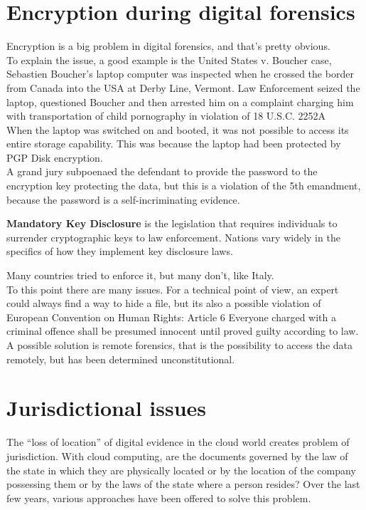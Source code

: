 \section{Encryption during digital forensics}
Encryption is a big problem in digital forensics, and that's pretty
obvious.\\ 
To explain the issue, a good example is the United States v. Boucher
case, Sebastien Boucher's laptop computer was inspected when he
crossed the border from Canada into the USA at Derby Line, Vermont.
Law Enforcement seized the laptop, questioned Boucher and then
arrested him on a complaint charging him with transportation of child
pornography in violation of 18 U.S.C. 2252A\\
When the laptop was switched on and booted, it was not possible to 
access its entire storage capability. This was because the laptop had been protected by 
PGP Disk encryption.\\
A grand jury subpoenaed the defendant to provide the password to 
the encryption key protecting the data, but this is a violation of the
5th emandment, because the password is a self-incriminating
evidence.\\
\begin{boxH}
  \textbf{Mandatory Key Disclosure} is the legislation that requires
  individuals to surrender cryptographic keys to law enforcement.
  Nations vary widely in the specifics of how they implement key
  disclosure laws.
\end{boxH}
Many countries tried to enforce it, but many don't, like Italy.\\
To this point there are many issues. For a technical point of view, an
expert could always find a way to hide a file, but its also a possible
violation of European Convention on Human Rights: Article 6 Everyone
charged with a criminal offence shall be presumed innocent until
proved guilty according to law.\\
A possible solution is remote forensics, that is the possibility to 
access the data remotely, but has been determined unconstitutional.
\section{Jurisdictional issues}
The “loss of location” of digital evidence in the cloud world creates
problem of jurisdiction. With cloud computing, are the documents
governed by the law of the state in which they are physically located
or by the location of the company possessing them or by the laws of
the state where a person resides? Over the last few years, various
approaches have been offered to solve this problem.

